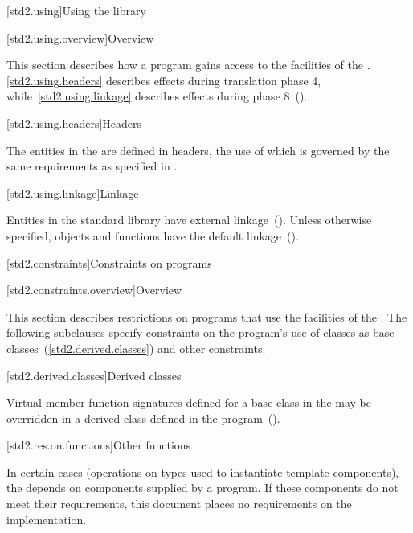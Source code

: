 [std2.using]{Using the library}

[std2.using.overview]{Overview}

\pnum
This section describes how a \Cpp program gains access to the facilities of the
. \ref{std2.using.headers} describes effects during translation
phase 4, while~\ref{std2.using.linkage} describes effects during phase
8~().

[std2.using.headers]{Headers}

The entities in the  are defined in headers, the use of which is
governed by the same requirements as specified in .

[std2.using.linkage]{Linkage}

\pnum
Entities in the \Cpp standard library have external
linkage~(). Unless otherwise specified, objects and functions
have the default  linkage~().

[std2.constraints]{Constraints on programs}

[std2.constraints.overview]{Overview}

\pnum
This section describes restrictions on \Cpp programs that use the facilities of
the . The following subclauses specify constraints on the
program's use of  classes as base classes~(\ref{std2.derived.classes})
and other constraints.

[std2.derived.classes]{Derived classes}

\pnum
Virtual member function signatures defined
%
for a base class in the 
%
%
 may be overridden in a derived class defined in the
program~().

[std2.res.on.functions]{Other functions}

\pnum
In certain cases (operations on types used to instantiate 
template components), the  depends on components supplied by a
\Cpp program. If these components do not meet their requirements, this document
places no requirements on the implementation.

